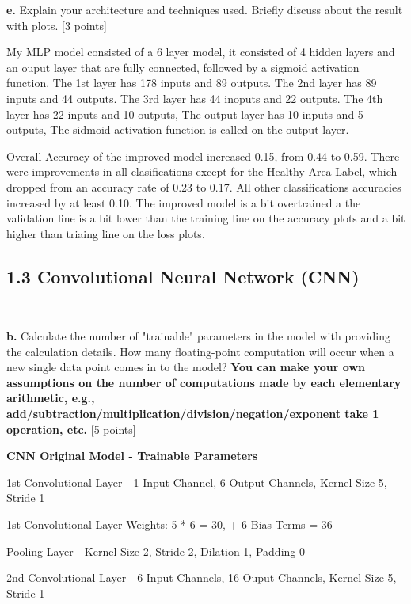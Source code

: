 \documentclass[12pt]{article}
\begin{document}
{{{{{{{{\bigskip

\textbf{e.} Explain your architecture and techniques used. Briefly discuss about the result with plots. [3 points]

\bigskip

My MLP model consisted of a 6 layer model, it consisted of 4 hidden layers and an ouput layer that are fully connected, followed by a sigmoid activation function.  The 1st layer has 178 inputs and 89 outputs.  The 2nd layer has 89 inputs and 44 outputs.  The 3rd layer has 44 inoputs and 22 outputs.  The 4th layer has 22 inputs and 10 outputs, The output layer has 10 inputs and 5 outputs, The sidmoid activation function is called on the output layer. 

\bigskip

Overall Accuracy of the improved model increased 0.15, from 0.44 to 0.59. There were improvements in all clasifications except for the Healthy Area Label, which dropped from an accuracy rate of 0.23 to 0.17.  All other classifications accuracies increased by at least 0.10.  The improved model is a bit overtrained a the validation line is a bit lower than the training line on the accuracy plots and a bit higher than triaing line on the loss plots.


\subsection*{1.3 Convolutional Neural Network (CNN)}
~

\textbf{b.} Calculate the number of "trainable" parameters in the model with providing the calculation details. How many floating-point computation will occur when a new single data point comes in to the model?  \textbf{You can make your own assumptions on the number of computations made by each elementary arithmetic, e.g., add/subtraction/multiplication/division/negation/exponent take 1 operation, etc.} [5 points]

\bigskip

\textbf{CNN Original Model - Trainable Parameters}

1st Convolutional Layer - 1 Input Channel, 6 Output Channels, Kernel Size 5, Stride 1

1st Convolutional Layer Weights: 5 * 6 = 30, + 6 Bias Terms = 36

Pooling Layer - Kernel Size 2, Stride 2, Dilation 1, Padding 0

2nd Convolutional Layer - 6 Input Channels, 16 Ouput Channels, Kernel Size 5, Stride 1

}}}}}}}}
\end{document}
